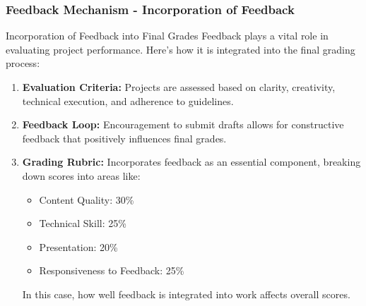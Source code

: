 \documentclass[aspectratio=169]{beamer}
\begin{document}
\begin{frame}[fragile]
    \frametitle{Feedback Mechanism - Incorporation of Feedback}
    \begin{block}{Incorporation of Feedback into Final Grades}
        Feedback plays a vital role in evaluating project performance. Here’s how it is integrated into the final grading process:
    \end{block}
    \begin{enumerate}
        \item \textbf{Evaluation Criteria:} Projects are assessed based on clarity, creativity, technical execution, and adherence to guidelines.
        
        \item \textbf{Feedback Loop:} Encouragement to submit drafts allows for constructive feedback that positively influences final grades.
        
        \item \textbf{Grading Rubric:} Incorporates feedback as an essential component, breaking down scores into areas like:
        \begin{itemize}
            \item Content Quality: 30\%
            \item Technical Skill: 25\%
            \item Presentation: 20\%
            \item Responsiveness to Feedback: 25\%
        \end{itemize}
        In this case, how well feedback is integrated into work affects overall scores.
    \end{enumerate}
\end{frame}
\end{document}
